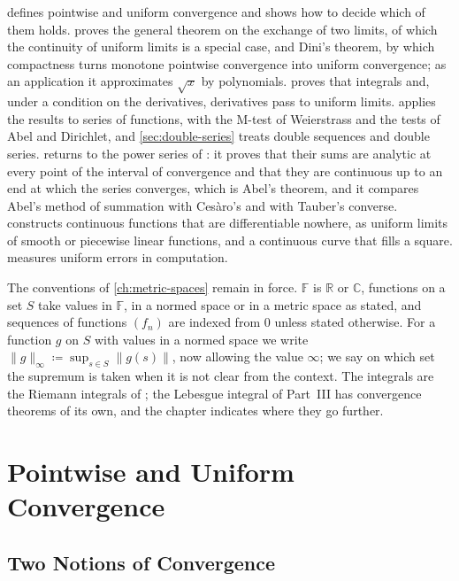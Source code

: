  defines pointwise and uniform convergence and shows how to decide which of them holds.  proves the general theorem on the exchange of two limits, of which the continuity of uniform limits is a special case, and Dini's theorem, by which compactness turns monotone pointwise convergence into uniform convergence; as an application it approximates $\sqrt x$ by polynomials.  proves that integrals and, under a condition on the derivatives, derivatives pass to uniform limits.  applies the results to series of functions, with the M-test of Weierstrass and the tests of Abel and Dirichlet, and \cref{sec:double-series} treats double sequences and double series.  returns to the power series of : it proves that their sums are analytic at every point of the interval of convergence and that they are continuous up to an end at which the series converges, which is Abel's theorem, and it compares Abel's method of summation with Ces\`aro's and with Tauber's converse.  constructs continuous functions that are differentiable nowhere, as uniform limits of smooth or piecewise linear functions, and a continuous curve that fills a square.  measures uniform errors in computation.

The conventions of \cref{ch:metric-spaces} remain in force. $\mathbb F$ is $\mathbb R$ or $\mathbb C$, functions on a set $S$ take values in $\mathbb F$, in a normed space or in a metric space as stated, and sequences of functions $(f_n)$ are indexed from $0$ unless stated otherwise. For a function $g$ on $S$ with values in a normed space we write $\|g\|_\infty\coloneqq\sup_{s\in S}\|g(s)\|$, now allowing the value $\infty$; we say on which set the supremum is taken when it is not clear from the context. The integrals are the Riemann integrals of ; the Lebesgue integral of Part~III has convergence theorems of its own, and the chapter indicates where they go further.

\section{Pointwise and Uniform Convergence}
\label{sec:pointwise-uniform}

\subsection{Two Notions of Convergence}

